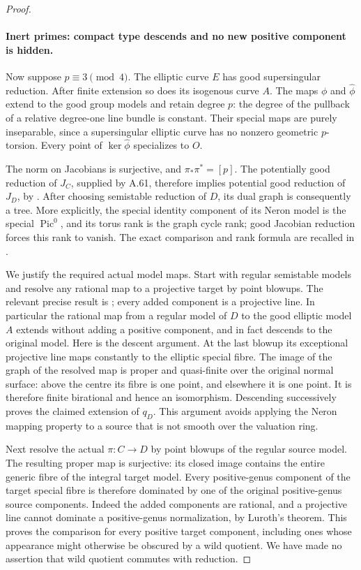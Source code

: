 \begin{proof}
\paragraph{Inert primes: compact type descends and no new positive component is hidden.}
Now suppose \(p\equiv3\pmod4\). The elliptic
curve \(E\) has good supersingular reduction.
After finite extension so does its isogenous
curve \(A\). The maps \(\phi\) and
\(\widehat\phi\) extend to the good group
models and retain degree \(p\): the degree
of the pullback of a relative degree-one
line bundle is constant. Their special maps
are purely inseparable, since a supersingular
elliptic curve has no nonzero geometric
\(p\)-torsion. Every point of
\(\ker\widehat\phi\) specializes to \(O\).

The norm on Jacobians is surjective, and
\(\pi_*\pi^*=[p]\). The potentially good
reduction of \(J_C\), supplied by A.61,
therefore implies potential good reduction
of \(J_D\), by
\cite[Theorem 1 and Corollary 2, p.493]{fghSerreTate1968}.
After choosing semistable reduction of \(D\),
its dual graph is consequently a tree. More
explicitly, the special identity component
of its Neron model is the special \(\operatorname{Pic}^0\),
and its torus rank is the graph cycle rank;
good Jacobian reduction forces this rank to
vanish. The exact comparison and rank formula
are recalled in \cite[Remark 10.4.24 and
Lemma 7.5.18(b)]{fghLiu}.

We justify the required actual model maps.
Start with regular semistable models and
resolve any rational map to a projective
target by point blowups. The relevant precise
result is \cite[Theorem 9.2.7, pp.396--397;
Proposition 9.2.5]{fghLiu}; every added
component is a projective line. In particular
the rational map from a regular model of
\(D\) to the good elliptic model \(A\)
extends without adding a positive component,
and in fact descends to the original model.
Here is the descent argument. At the last
blowup its exceptional projective line maps
constantly to the elliptic special fibre.
The image of the graph of the resolved map
is proper and quasi-finite over the original
normal surface: above the centre its fibre
is one point, and elsewhere it is one point.
It is therefore finite birational and hence
an isomorphism. Descending successively proves
the claimed extension of \(q_D\). This
argument avoids applying the Neron mapping
property to a source that is not smooth
over the valuation ring.

Next resolve the actual \(\pi:C\to D\)
by point blowups of the regular source model.
The resulting proper map is surjective: its
closed image contains the entire generic
fibre of the integral target model. Every
positive-genus component of the target
special fibre is therefore dominated by
one of the original positive-genus source
components. Indeed the added components are
rational, and a projective line cannot
dominate a positive-genus normalization,
by Luroth's theorem. This proves the
comparison for every positive target
component, including ones whose appearance
might otherwise be obscured by a wild quotient.
We have made no assertion that wild quotient
commutes with reduction.


\end{proof}
